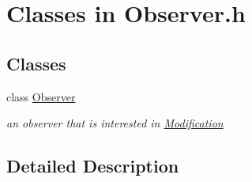 \hypertarget{group___observer___c_l_a_s_s_e_s}{}\section{Classes in Observer.\+h}
\label{group___observer___c_l_a_s_s_e_s}
\subsection*{Classes}
\begin{DoxyCompactItemize}
\item 
class \mbox{\hyperlink{class_s_m_spp__di__unipi__it_1_1_observer}{Observer}}
\begin{DoxyCompactList}\small\item\em an observer that is interested in \mbox{\hyperlink{class_s_m_spp__di__unipi__it_1_1_modification}{Modification}} \end{DoxyCompactList}\end{DoxyCompactItemize}


\subsection{Detailed Description}
